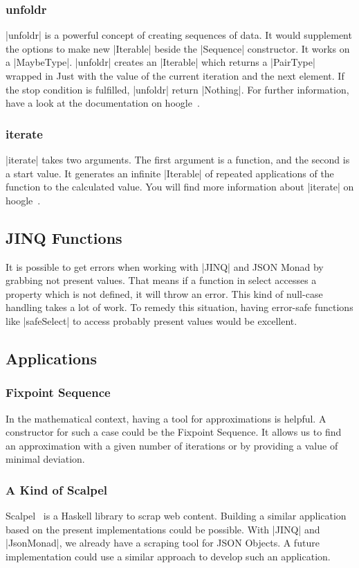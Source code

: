 \subsubsection{unfoldr}
\label{subsub:unfoldr}
|unfoldr| is a powerful concept of creating sequences of data. It would
supplement the options to make new |Iterable| beside the |Sequence|
constructor. It works on a |MaybeType|. |unfoldr| creates an |Iterable| which returns
a |PairType| wrapped in Just with the value of the current iteration and the next
element. If the stop condition is fulfilled, |unfoldr| return |Nothing|. For
further information, have a look at the documentation on hoogle~\cite{hoogle_unfoldr}.

\subsubsection{iterate}
\label{subsub:iterate}
|iterate| takes two arguments. The first argument is a function, and the second
is a start value. It generates an infinite |Iterable| of repeated applications of
the function to the calculated value. You will find more information about
|iterate| on hoogle~\cite{hoogle_iterate}.

\subsection{JINQ Functions}
\label{sub:JINQ Functions}
It is possible to get errors when working with |JINQ| and JSON Monad by grabbing
not present values. That means if a function in select accesses a property
which is not defined, it will throw an error. This kind of null-case handling
takes a lot of work. To remedy this situation, having error-safe functions like
|safeSelect| to access probably present values would be excellent.

\subsection{Applications}
\label{sub:Applications}
\subsubsection{Fixpoint Sequence}
\label{subsub:Fixpoint Sequence}
In the mathematical context, having a tool for approximations is helpful. A
constructor for such a case could be the Fixpoint Sequence. It allows us to
find an approximation with a given number of iterations or by providing a value
of minimal deviation.

\subsubsection{A Kind of Scalpel}
\label{subsub:A Kind of Scalpel}
Scalpel~\cite{scalpel} is a Haskell library to scrap web content. Building a similar
application based on the present implementations could be possible. With |JINQ|
and |JsonMonad|, we already have a scraping tool for JSON Objects. A future
implementation could use a similar approach to develop such an application.
